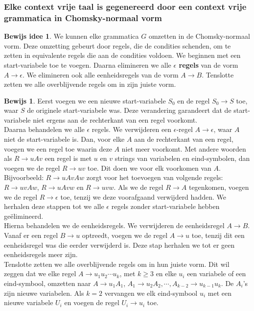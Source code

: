 \documentclass[12pt,a4paper]{article}
\theoremstyle{definition}
\newtheorem{bIdee}{Bewijs idee}[section]
\newtheorem{bewijs}{Bewijs}[section]
\newcommand{\ra}{\ensuremath{\rightarrow}}
\begin{document}
\subsubsection{Elke context vrije taal is gegenereerd door een context vrije grammatica in Chomsky-normaal vorm}
\begin{bIdee}
We kunnen elke grammatica $G$ omzetten in de Chomsky-normaal vorm. Deze omzetting gebeurt door regels, die de condities schenden, om te zetten in equivalente regels die aan de condities voldoen. We beginnen met een start-variabele toe te voegen. Daarna elimineren we alle \textbf{$\epsilon$ regels} van de vorm $A \rightarrow \epsilon$. We elimineren ook alle eenheidsregels van de vorm $A\rightarrow B$. Tenslotte zetten we alle overblijvende regels om in zijn juiste vorm.
\end{bIdee}
\begin{bewijs}
Eerst voegen we een nieuwe start-variabele $S_0$ en de regel $S_0 \rightarrow S$ toe, waar $S$ de originele start-variabele was. Deze verandering garandeert dat de start-variabele niet ergens aan de rechterkant van een regel voorkomt.\\
Daarna behandelen we alle $\epsilon$ regels. We verwijderen een $\epsilon$-regel $A\rightarrow \epsilon$, waar $A$ niet de start-variabele is. Dan, voor elke $A$ aan de rechterkant van een regel, voegen we een regel toe waarin deze $A$ niet meer voorkomt. Met andere woorden als $R\rightarrow uAv$ een regel is met $u$ en $v$ strings van variabelen en eind-symbolen, dan voegen we de regel $R\rightarrow uv$ toe. Dit doen we voor elk voorkomen van $A$. Bijvoorbeeld: $R\rightarrow uAvAw$ zorgt voor het toevoegen van volgende regels: $R\rightarrow uvAw$, $R\rightarrow uAvw$ en $R\rightarrow uvw$. Als we de regel $R\rightarrow A$ tegenkomen, voegen we de regel $R\rightarrow \epsilon$ toe, tenzij we deze voorafgaand verwijderd hadden. We herhalen deze stappen tot we alle $\epsilon$ regels zonder start-variabele hebben geëlimineerd.\\
Hierna behandelen we de eenheidsregels. We verwijderen de eenheidsregel $A \ra B$. Vanaf er een regel $B \ra u$ optreedt, voegen we de regel $A \ra u$ toe, tenzij dit een eenheidsregel was die eerder verwijderd is. Deze stap herhalen we tot er geen eenheidsregels meer zijn.\\
Tenslotte zetten we alle overblijvende regels om in hun juiste vorm. Dit wil zeggen dat we elke regel $A\ra u_1u_2\cdots u_k$, met $k \geq 3$ en elke $u_i$ een variabele of een eind-symbool, omzetten naar $A\ra u_1A_1$, $A_1 \ra u_2A_2,\cdots , A_{k-2} \rightarrow u_{k-1}u_k$. De $A_i$'s zijn nieuwe variabelen. Als $k = 2$ vervangen we elk eind-symbool $u_i$ met een nieuwe variabele $U_i$ en voegen de regel $U_i\ra u_i$ toe. 
\end{bewijs}
\end{document}

